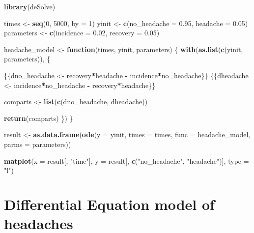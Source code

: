 \documentclass[]{article}
\newenvironment{Shaded}{\begin{snugshade}}{\end{snugshade}}
\newcommand{\KeywordTok}[1]{\textcolor[rgb]{0.13,0.29,0.53}{\textbf{#1}}}
\newcommand{\DataTypeTok}[1]{\textcolor[rgb]{0.13,0.29,0.53}{#1}}
\newcommand{\DecValTok}[1]{\textcolor[rgb]{0.00,0.00,0.81}{#1}}
\newcommand{\FloatTok}[1]{\textcolor[rgb]{0.00,0.00,0.81}{#1}}
\newcommand{\StringTok}[1]{\textcolor[rgb]{0.31,0.60,0.02}{#1}}
\newcommand{\ControlFlowTok}[1]{\textcolor[rgb]{0.13,0.29,0.53}{\textbf{#1}}}
\newcommand{\OperatorTok}[1]{\textcolor[rgb]{0.81,0.36,0.00}{\textbf{#1}}}
\newcommand{\NormalTok}[1]{#1}
\begin{document}
\begin{Shaded}
\begin{Highlighting}[]
\KeywordTok{library}\NormalTok{(deSolve)}

\NormalTok{times <-}\StringTok{ }\KeywordTok{seq}\NormalTok{(}\DecValTok{0}\NormalTok{, }\DecValTok{5000}\NormalTok{, }\DataTypeTok{by =} \DecValTok{1}\NormalTok{)}
\NormalTok{yinit <-}\StringTok{ }\KeywordTok{c}\NormalTok{(}\DataTypeTok{no_headache =} \FloatTok{0.95}\NormalTok{, }\DataTypeTok{headache =} \FloatTok{0.05}\NormalTok{)}
\NormalTok{parameters <-}\StringTok{ }\KeywordTok{c}\NormalTok{(}\DataTypeTok{incidence =} \FloatTok{0.02}\NormalTok{, }\DataTypeTok{recovery =} \FloatTok{0.05}\NormalTok{)}

\NormalTok{headache_model <-}\StringTok{ }\ControlFlowTok{function}\NormalTok{(times, yinit, parameters) \{}
    \KeywordTok{with}\NormalTok{(}\KeywordTok{as.list}\NormalTok{(}\KeywordTok{c}\NormalTok{(yinit, parameters)), \{}
      
\NormalTok{     \{\{dno_headache <-}\StringTok{ }\NormalTok{recovery}\OperatorTok{*}\NormalTok{headache }\OperatorTok{-}\StringTok{ }\NormalTok{incidence}\OperatorTok{*}\NormalTok{no_headache\}\}}
\NormalTok{     \{\{dheadache <-}\StringTok{ }\NormalTok{incidence}\OperatorTok{*}\NormalTok{no_headache }\OperatorTok{-}\StringTok{ }\NormalTok{recovery}\OperatorTok{*}\NormalTok{headache\}\}}
      
\NormalTok{      comparts <-}\StringTok{ }\KeywordTok{list}\NormalTok{(}\KeywordTok{c}\NormalTok{(dno_headache, dheadache))}
      
      \KeywordTok{return}\NormalTok{(comparts)}
\NormalTok{    \})}
\NormalTok{\}}

\NormalTok{result <-}\StringTok{ }\KeywordTok{as.data.frame}\NormalTok{(}\KeywordTok{ode}\NormalTok{(}\DataTypeTok{y =}\NormalTok{ yinit, }\DataTypeTok{times =}\NormalTok{ times, }
                            \DataTypeTok{func =}\NormalTok{ headache_model, }\DataTypeTok{parms =}\NormalTok{ parameters))}

\KeywordTok{matplot}\NormalTok{(}\DataTypeTok{x =}\NormalTok{ result[, }\StringTok{"time"}\NormalTok{], }
        \DataTypeTok{y =}\NormalTok{ result[, }\KeywordTok{c}\NormalTok{(}\StringTok{"no_headache"}\NormalTok{, }\StringTok{"headache"}\NormalTok{)], }\DataTypeTok{type =} \StringTok{"l"}\NormalTok{)}
\end{Highlighting}
\end{Shaded}

\section{Differential Equation model of
headaches}\label{differential-equation-model-of-headaches-1}
\end{document}
